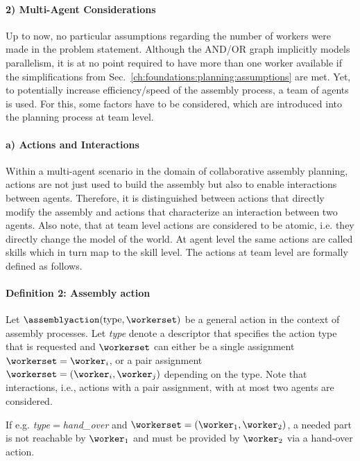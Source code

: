\paragraph{2) Multi-Agent Considerations}

Up to now, no particular assumptions regarding the number of workers were made in the problem statement.
Although the AND/OR graph implicitly models parallelism, it is at no point required to have more than one worker available if the simplifications from Sec.~\ref{ch:foundations:planning:assumptions} are met.
Yet, to potentially increase efficiency/speed of the assembly process, a team of agents is used.
For this, some factors have to be considered, which are introduced into the planning process at team level.

\paragraph{a) Actions and Interactions}

Within a multi-agent scenario in the domain of collaborative assembly planning, actions are not just used to build the assembly but also to enable interactions between agents.
Therefore, it is distinguished between actions that directly modify the assembly and actions that characterize an interaction between two agents.
Also note, that at team level actions are considered to be atomic, i.e. they directly change the model of the world.
At agent level the same actions are called skills which in turn map to the skill level.
The actions at team level are formally defined as follows.


\paragraph{Definition 2: Assembly action}

Let $\assemblyaction(\text{type},\workerset)$ be a general action in the context of assembly processes.
Let \emph{type} denote a descriptor that specifies the action type that is requested and $\workerset$ can either be a single assignment $\workerset=\worker_i$, or a pair assignment $\workerset=(\worker_i,\worker_j)$ depending on the type.
Note that interactions, i.e., actions with a pair assignment, with at most two agents are considered.

If e.g. \emph{type}$=$\emph{hand\_over} and $\workerset=(\worker_1,\worker_2)$, a needed part is not reachable by $\worker_1$ and must be provided by $\worker_2$ via a hand-over action.


